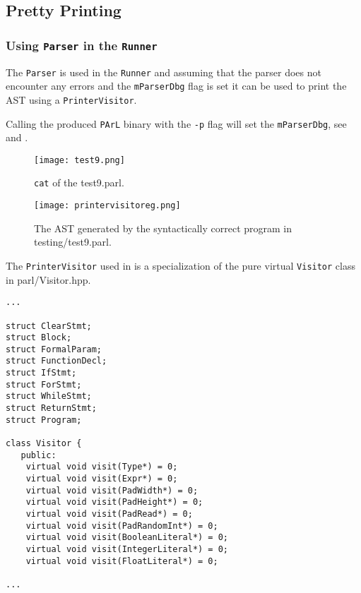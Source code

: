 \subsection{Pretty Printing}

\subsubsection{Using \texttt{Parser} in the \texttt{Runner}}

The \texttt{Parser} is used in the \texttt{Runner} and assuming
that the parser does not encounter any errors and the
\texttt{mParserDbg} flag is set it can be used to print the AST
using a \texttt{PrinterVisitor}.



Calling the produced \texttt{PArL} binary with the \texttt{-p}
flag will set the \texttt{mParserDbg}, see  and
.

\begin{figure}[H]
\centering
\texttt{[image: test9.png]}
\caption{\texttt{cat} of the test9.parl.}
\label{fig:test9}
\end{figure}

\begin{figure}[H]
\centering
\texttt{[image: printervisitoreg.png]}
\caption{The AST generated by the syntactically correct program
in testing/test9.parl.}
\label{fig:parseeg}
\end{figure}



The \texttt{PrinterVisitor} used in  is
a specialization of the pure virtual \texttt{Visitor} class
in parl/Visitor.hpp.

\begin{lstlisting}[caption={A segment of the pure virtual
\texttt{Visitor} class (parl/Visitor.hpp).},
label=lst:genericvisitor]
...

struct ClearStmt;
struct Block;
struct FormalParam;
struct FunctionDecl;
struct IfStmt;
struct ForStmt;
struct WhileStmt;
struct ReturnStmt;
struct Program;

class Visitor {
   public:
    virtual void visit(Type*) = 0;
    virtual void visit(Expr*) = 0;
    virtual void visit(PadWidth*) = 0;
    virtual void visit(PadHeight*) = 0;
    virtual void visit(PadRead*) = 0;
    virtual void visit(PadRandomInt*) = 0;
    virtual void visit(BooleanLiteral*) = 0;
    virtual void visit(IntegerLiteral*) = 0;
    virtual void visit(FloatLiteral*) = 0;

...
\end{lstlisting}

